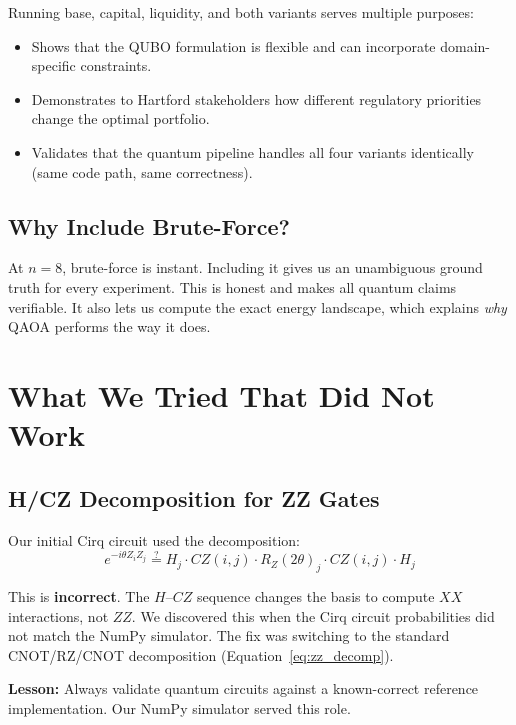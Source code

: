 \documentclass[12pt, a4paper]{article}
\begin{document}
Running base, capital, liquidity, and both variants serves multiple purposes:
\begin{itemize}
    \item Shows that the QUBO formulation is flexible and can incorporate domain-specific constraints.
    \item Demonstrates to Hartford stakeholders how different regulatory priorities change the optimal portfolio.
    \item Validates that the quantum pipeline handles all four variants identically (same code path, same correctness).
\end{itemize}

\subsection{Why Include Brute-Force?}

At $n = 8$, brute-force is instant. Including it gives us an unambiguous ground
truth for every experiment. This is honest and makes all quantum claims
verifiable. It also lets us compute the exact energy landscape, which explains
\textit{why} QAOA performs the way it does.


\section{What We Tried That Did Not Work}

\subsection{H/CZ Decomposition for ZZ Gates}

Our initial Cirq circuit used the decomposition:
\[
e^{-i\theta Z_i Z_j} \stackrel{?}{=} H_j \cdot CZ(i,j) \cdot R_Z(2\theta)_j \cdot CZ(i,j) \cdot H_j
\]

This is \textbf{incorrect}. The $H$--$CZ$ sequence changes the basis to compute
$XX$ interactions, not $ZZ$. We discovered this when the Cirq circuit
probabilities did not match the NumPy simulator. The fix was switching to the
standard CNOT/RZ/CNOT decomposition (Equation~\ref{eq:zz_decomp}).

\textbf{Lesson:} Always validate quantum circuits against a known-correct
reference implementation. Our NumPy simulator served this role.
\end{document}
